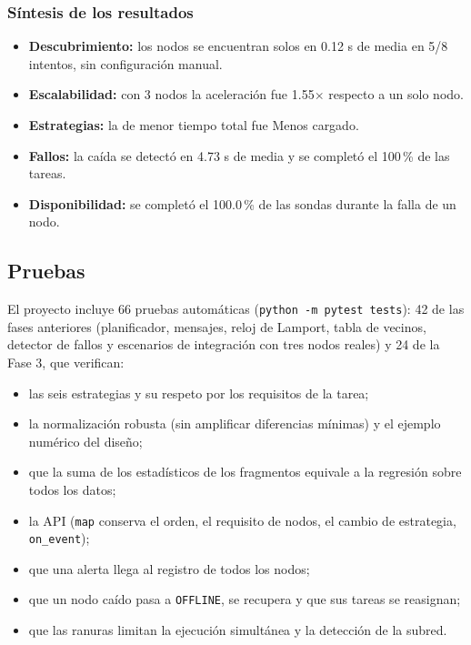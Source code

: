 \subsubsection{Síntesis de los resultados}

\begin{itemize}
\item \textbf{Descubrimiento:} los nodos se encuentran solos en 0.12 s de media en 5/8 intentos, sin configuración manual.
\item \textbf{Escalabilidad:} con 3 nodos la aceleración fue 1.55$\times$ respecto a un solo nodo.
\item \textbf{Estrategias:} la de menor tiempo total fue Menos cargado.
\item \textbf{Fallos:} la caída se detectó en 4.73 s de media y se completó el 100\,\% de las tareas.
\item \textbf{Disponibilidad:} se completó el 100.0\,\% de las sondas durante la falla de un nodo.
\end{itemize}


\subsection{Pruebas}

El proyecto incluye 66 pruebas automáticas (\texttt{python -m pytest tests}): 42 de las fases anteriores
(planificador, mensajes, reloj de Lamport, tabla de vecinos, detector de fallos y escenarios de
integración con tres nodos reales) y 24 de la Fase 3, que verifican:

\begin{itemize}
\item las seis estrategias y su respeto por los requisitos de la tarea;
\item la normalización robusta (sin amplificar diferencias mínimas) y el ejemplo numérico del diseño;
\item que la suma de los estadísticos de los fragmentos equivale a la regresión sobre todos los datos;
\item la API (\texttt{map} conserva el orden, el requisito de nodos, el cambio de estrategia, \texttt{on\_event});
\item que una alerta llega al registro de todos los nodos;
\item que un nodo caído pasa a \texttt{OFFLINE}, se recupera y que sus tareas se reasignan;
\item que las ranuras limitan la ejecución simultánea y la detección de la subred.
\end{itemize}

